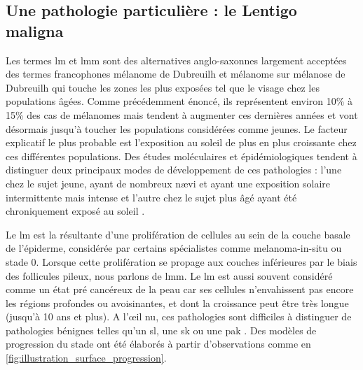 \subsection{Une pathologie particulière : le Lentigo maligna}
\label{subsec:lentigo}
Les termes \acrfull{lm} et \acrfull{lmm} sont des alternatives anglo-saxonnes largement acceptées des termes francophones mélanome de Dubreuilh et mélanome sur mélanose de Dubreuilh qui touche les zones les plus exposées tel que le visage chez les populations âgées. Comme précédemment énoncé, ils représentent environ 10\% à 15\% des cas de mélanomes mais tendent à augmenter ces dernières années et vont désormais jusqu'à toucher les populations considérées comme jeunes. Le facteur explicatif le plus probable est l'exposition au soleil de plus en plus croissante chez ces différentes populations. Des études moléculaires et épidémiologiques tendent à distinguer deux principaux modes de développement de ces pathologies : l'une chez le sujet jeune, ayant de nombreux nævi et ayant une exposition solaire intermittente mais intense et l'autre chez le sujet plus âgé ayant été chroniquement exposé au soleil \cite{Baccard2009, LeGal2011, LeDuff2014}.\par

Le \gls{lm} est la résultante d'une prolifération de cellules au sein de la couche basale de l'épiderme, considérée par certains spécialistes comme melanoma-in-situ ou stade 0. Lorsque cette prolifération se propage aux couches inférieures par le biais des follicules pileux, nous parlons de \gls{lmm}. Le \gls{lm} est aussi souvent considéré comme un état pré cancéreux de la peau car ses cellules n'envahissent pas encore les régions profondes ou avoisinantes, et dont la croissance peut être très longue (jusqu'à 10 ans et plus). A l’œil nu, ces pathologies sont difficiles à distinguer de pathologies bénignes telles qu'un \gls{sl}, une \gls{sk} ou une \gls{pak} \cite{LeGal2011, LeDuff2014}. Des modèles de progression du stade ont été élaborés à partir d'observations comme en \cref{fig:illustration_surface_progression}.\par

